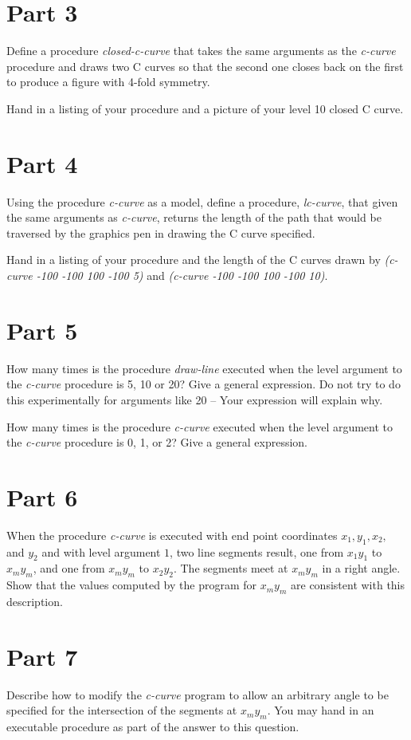\section{Part 3}

Define a procedure {\it closed-c-curve} that takes the same arguments as
the {\it c-curve} procedure and draws two C curves so that the second
one closes back on the first to produce a figure with 4-fold symmetry.

Hand in a listing of your procedure and a picture of your level 
10 closed C curve.

\section{Part 4}
Using the procedure {\it c-curve} as a model, define a procedure,
{\it lc-curve}, that given the same arguments as {\it c-curve}, 
returns the length of the path that would be traversed by the graphics
pen in drawing the C curve specified.

Hand in a listing of your procedure and
the length of the C curves drawn by  {\it (c-curve -100 -100 100
-100 5)} and {\it (c-curve -100 -100 100 -100 10)}.


\section{Part 5}
How many times is the procedure {\it draw-line} executed when the level
argument to the {\it c-curve} procedure is 5, 10 or 20?  Give a
general expression.  Do not try to
do this experimentally for arguments like 20 -- Your expression will
explain why.

How many times is the procedure {\it c-curve} executed when the level
argument to the {\it c-curve} procedure is 0, 1, or 2?  Give a
general expression.


\section{Part 6}
When the procedure {\it c-curve} is executed with end point coordinates
$x_1, y_1, x_2,$ and $y_2$ and with level argument
$1$, two line segments result, one from $x_1 y_1$ to 
$x_m y_m$, and one from $x_m y_m$ to
$x_2 y_2$.  The segments meet at $x_m y_m$ in
a right angle.  Show that the values computed by the program for
$x_m y_m$ are consistent with this description.

\section{Part 7}
Describe how to modify the {\it c-curve} program to allow an arbitrary angle
to be specified for the intersection of the segments at $x_m y_m$.
You may hand in an executable procedure as part of the answer to
this question.


